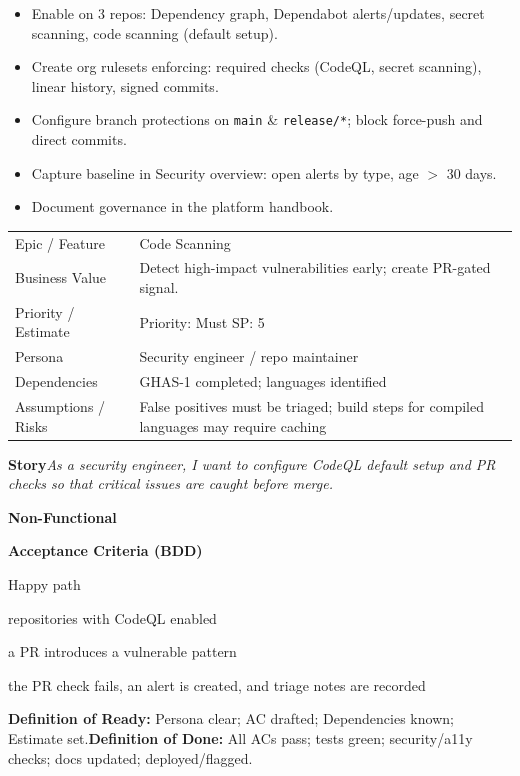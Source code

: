 \documentclass[11pt,a4paper]{article}
\newcommand{\cb}{\(\square\)}
\newenvironment{GHASCard}[2]{%
  \begin{tcolorbox}[ghascard,title={\ghasheader{#1 --- #2}}]
  \small
}{%
  \end{tcolorbox}
}
\newenvironment{GHASTasks}{%
  \begin{tcolorbox}[ghastasks]
  \small
  \begin{itemize}[label=\cb, leftmargin=*, labelsep=0.6em]
}{%
  \end{itemize}
  \end{tcolorbox}
}
\newcommand{\DoR}{\textbf{Definition of Ready:} Persona clear; AC drafted; Dependencies known; Estimate set.}
\newcommand{\DoD}{\textbf{Definition of Done:} All ACs pass; tests green; security/a11y checks; docs updated; deployed/flagged.}
\begin{document}
\begin{GHASTasks}
\item Enable on 3 repos: Dependency graph, Dependabot alerts/updates, secret scanning, code scanning (default setup).
\item Create org rulesets enforcing: required checks (CodeQL, secret scanning), linear history, signed commits.
\item Configure branch protections on \texttt{main} \& \texttt{release/*}; block force-push and direct commits.
\item Capture baseline in Security overview: open alerts by type, age $>$ 30 days.
\item Document governance in the platform handbook.
\end{GHASTasks}
\clearpage

\begin{GHASCard}{GHAS-2}{Code Scanning with CodeQL (Essentials)}
\begin{tabularx}{\linewidth}{L V}
Epic / Feature & Code Scanning \tabularnewline
Business Value & Detect high-impact vulnerabilities early; create PR-gated signal. \tabularnewline
Priority / Estimate & Priority: Must \quad SP: 5 \tabularnewline
Persona & Security engineer / repo maintainer \tabularnewline
Dependencies & GHAS-1 completed; languages identified \tabularnewline
Assumptions / Risks & False positives must be triaged; build steps for compiled languages may require caching \tabularnewline
\end{tabularx}

\medskip
\textbf{Story}\quad \emph{As a security engineer, I want to configure CodeQL default setup and PR checks so that critical issues are caught before merge.}

\medskip
\textbf{Non-Functional}\quad
{}\ 

\medskip
\textbf{Acceptance Criteria (BDD)}
\begin{description}[leftmargin=2.7cm, labelwidth=2.6cm, style=nextline]
  \item[\textbf{Scenario}] Happy path
  \item[\textbf{Given}] repositories with CodeQL enabled
  \item[\textbf{When}] a PR introduces a vulnerable pattern
  \item[\textbf{Then}] the PR check fails, an alert is created, and triage notes are recorded
\end{description}

\medskip
\DoR\quad\textbullet\quad\DoD
\end{GHASCard}
\end{document}
